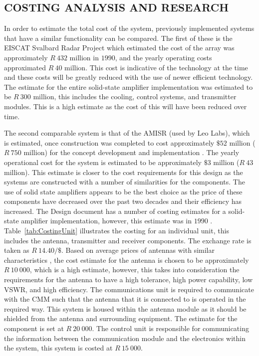 \documentclass[11pt]{witseiepaper}
\begin{document}
\begin{bibunit}[witseie]
\section{COSTING ANALYSIS AND RESEARCH} \label{sec:CostingAnalysisandResearch}

In order to estimate the total cost of the system, previously implemented systems that have a similar functionality can be compared. The first of these is the EISCAT Svalbard Radar Project \cite[p.~670]{EISCATPrice} which estimated the cost of the array was approximately $R~432$ million in $1990$, and the yearly operating costs approximated $R~40$ million. This cost is indicative of the technology at the time and these costs will be greatly reduced with the use of newer efficient technology.
The estimate for the entire solid-state amplifier implementation was estimated to be $R~300$ million, this includes the cooling, control systems, and transmitter modules. This is a high estimate as the cost of this will have been reduced over time.

The second comparable system is that of the AMISR (used by Leo Labs), which is estimated, once construction was completed to cost approximately $\$52$ million ($R~750$ million) for the concept development and implementation \cite[p.~333-337]{AMISRCosting}. The yearly operational cost for the system is estimated to be approximately $\$3$ million ($R~43$ million). This estimate is closer to the cost requirements for this design as the systems are constructed with a number of similarities for the components.
The use of solid state amplifiers appears to be the best choice as the price of these components have decreased over the past two decades and their efficiency has increased.
The Design document has a number of costing estimates for a solid-state amplifier implementation, however, this estimate was in $1990$ \cite[p.~37]{DesignDraft}.
Table~\ref{tab:CostingUnit} illustrates the costing for an individual unit, this includes the antenna, transmitter and receiver components. The exchange rate is taken as $R~14.40/\$$.
Based on average prices of antennas with similar characteristics \cite{AntennaPrice1,AntennaPrice2,AntennaPrice3,AntennaPrice4,AntennaPrice5}, the cost estimate for the antenna is chosen to be approximately $R~10~000$, which is a high estimate, however, this takes into consideration the requirements for the antenna to have a high tolerance, high power capability, low VSWR, and high efficiency. The communications unit is required to communicate with the CMM such that the antenna that it is connected to is operated in the required way. This system is housed within the antenna module as it should be shielded from the antenna and surrounding equipment. The estimate for the component is set at $R~20~000$. The control unit is responsible for communicating the information between the communication module and the electronics within the system, this system is costed at $R~15~000$.


\end{bibunit}
\end{document}
